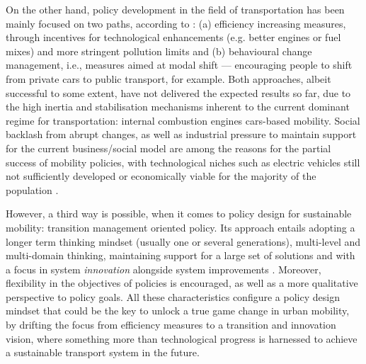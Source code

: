 \documentclass[a4paper,fontsize=11pt,bibliography=totoc]{scrartcl}
\begin{document}
On the other hand, policy development in the field of transportation has been mainly focused on two paths, according to \textcite{koehler2009_transitionsmodelsustainable}: (a) efficiency increasing measures, through incentives for technological enhancements (e.g. better engines or fuel mixes) and more stringent pollution limits and (b) behavioural change management, i.e., measures aimed at modal shift --- encouraging people to shift from private cars to public transport, for example. Both approaches, albeit successful to some extent, have not delivered the expected results so far, due to the high inertia and stabilisation mechanisms inherent to the current dominant regime for transportation: internal combustion engines cars-based mobility. Social backlash from abrupt changes, as well as industrial pressure to maintain support for the current business/social model are among the reasons for the partial success of mobility policies, with technological niches such as electric vehicles still not sufficiently developed or economically viable for the majority of the population \parencite{geels2012_AutomobilityTransitionSocio,nykvist2008_multilevelanalysis}.

However, a third way is possible, when it comes to policy design for sustainable mobility: transition management oriented policy. Its approach entails adopting a longer term thinking mindset (usually one or several generations), multi-level and multi-domain thinking, maintaining support for a large set of solutions and with a focus in system \textit{innovation} alongside system improvements \parencite{rotmans2001_Moreevolutionthan}. Moreover, flexibility in the objectives of policies is encouraged, as well as a more qualitative perspective to policy goals. All these characteristics configure a policy design mindset that could be the key to unlock a true game change in urban mobility, by drifting the focus from efficiency measures to a transition and innovation vision, where something more than technological progress is harnessed to achieve a sustainable transport system in the future.
\end{document}
